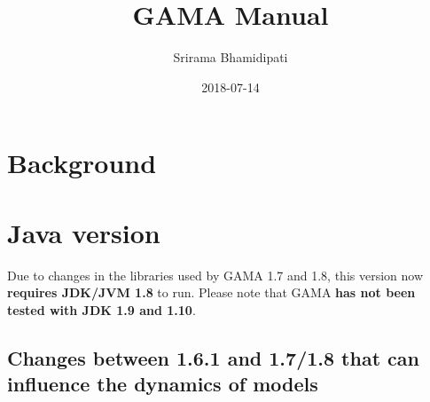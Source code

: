 \documentclass[]{book}
\title{GAMA Manual}
\author{Srirama Bhamidipati}
\date{2018-07-14}
\theoremstyle{definition}
\theoremstyle{definition}
\theoremstyle{definition}
\theoremstyle{remark}
\begin{document}
\maketitle

{
\setcounter{tocdepth}{1}
\tableofcontents
}
\chapter*{Background}\label{background}

\chapter{Java version}\label{java-version}

Due to changes in the libraries used by GAMA 1.7 and 1.8, this version
now \textbf{requires JDK/JVM 1.8} to run. Please note that GAMA
\textbf{has not been tested with JDK 1.9 and 1.10}.

\section{Changes between 1.6.1 and 1.7/1.8 that can influence the
dynamics of
models}\label{changes-between-1.6.1-and-1.71.8-that-can-influence-the-dynamics-of-models}
\end{document}
